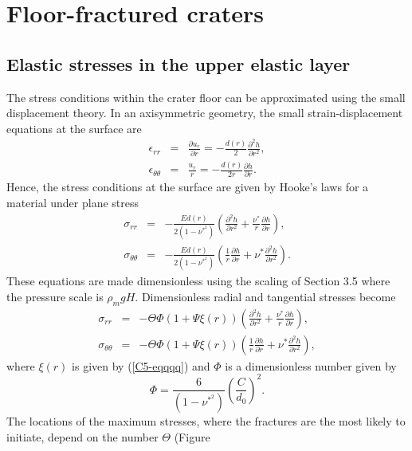 \chapter{Floor-fractured craters}
\label{chap:A4}

\section{Elastic stresses in the upper elastic layer}
\label{C5-AppendixB}
The  stress conditions  within the  crater floor  can be  approximated
using the small displacement theory.  In an axisymmetric geometry, the
small strain-displacement equations at the surface are
\begin{eqnarray}
  \epsilon_{rr}&=&\frac{\partial u_{r}}{\partial r}=-\frac{d(r)}{2}\frac{\partial^{2} h}{\partial r^{2}},\\
  \epsilon_{\theta\theta}&=&\frac{u_{r}}{r}=-\frac{d(r)}{2r}\frac{\partial h}{\partial r} .
\end{eqnarray}
Hence, the stress conditions at the  surface are given by Hooke's laws
for a material under plane stress
\begin{eqnarray}
  \sigma_{rr}&=&-\frac{E d(r)}{2(1-\nu^*^2)}\left (\frac{\partial^{2} h}{\partial r^{2}} +\frac{\nu^*}{r}\frac{\partial h}{\partial r} \right),\\
  \sigma_{\theta\theta}&=&-\frac{E d(r)}{2(1-\nu^*^2)}\left (\frac{1}{r}\frac{\partial h}{\partial r}+\nu^* \frac{\partial^{2}h}{\partial r^2}\right).
\end{eqnarray}
These equations  are made dimensionless  using the scaling  of Section
3.5 where the pressure scale is $\rho_m g H$. Dimensionless radial and
tangential stresses become
\begin{eqnarray}
  \sigma_{rr}&=&- \Theta \Phi \left(1+\Psi \xi(r)\right) \left ( \frac{\partial^{2} h}{\partial r^{2}} +\frac{\nu^*}{r}\frac{\partial h}{\partial r} \right) ,\\
  \sigma_{\theta\theta}&=&- \Theta \Phi \left(1+\Psi \xi(r)\right) \left (\frac{1}{r}\frac{\partial h}{\partial r}+\nu^* \frac{\partial^{2}h}{\partial r^2}\right),
\end{eqnarray}
where  $\xi(r)$  is   given  by  (\ref{C5-eqqqq})  and   $\Phi$  is  a
dimensionless number given by
\begin{equation}
  \Phi= \frac{6 }{(1-\nu^*^2)}\left( \frac{C}{d_0} \right)^{2}.
\end{equation}
The locations  of the  maximum stresses, where  the fractures  are the
most  likely  to  initiate,  depend on  the  number  $\Theta$  (Figure
